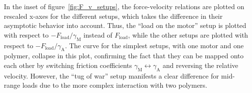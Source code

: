 \documentclass[aps,pre,twocolumn,showpacs,showkeys,superscriptaddress,floatfix]{revtex4-1}
\begin{document}
In the inset of figure~\ref{fig:F_v_setups}, 
the force-velocity relations are plotted on rescaled x-axes for the different setups, 
which takes the difference in their asymptotic behavior into account. 
Thus, the ``load on the motor'' setup is plotted with respect to $ - F_\text{load} / \gamma_\text{M}$ instead of $F_\text{load}$,
while the other setups are plotted with respect to $ - F_\text{load} / \gamma_\text{A}$.
The curve for the simplest setups, with one motor and one polymer, collapse in this plot, 
confirming the fact that they can be mapped onto each other by switching friction coefficients $\gamma_\text{M} \leftrightarrow \gamma_\text{A}$ 
and reversing the relative velocity. 
However, the ``tug of war'' setup manifests a clear difference for mid-range loads due to the more complex interaction with two polymers. 
\end{document}
